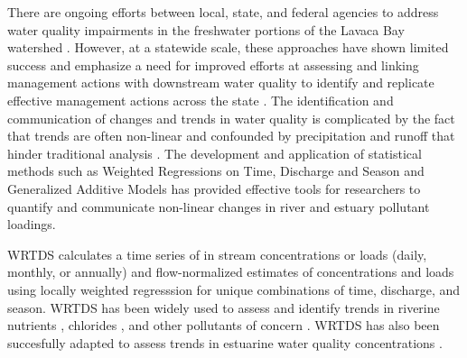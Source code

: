 \documentclass[sn-basic,referee,lineno,pdflatex]{sn-jnl}
\begin{document}
There are ongoing efforts between local, state, and federal agencies to
address water quality impairments in the freshwater portions of the
Lavaca Bay watershed
\citep{jainTechnicalSupportDocument2021, schrammLavacaRiverWatershed2018, bertholdDirectMailingEducation2021}.
However, at a statewide scale, these approaches have shown limited
success and emphasize a need for improved efforts at assessing and
linking management actions with downstream water quality to identify and
replicate effective management actions across the state
\citep{schrammTotalMaximumDaily2022}. The identification and
communication of changes and trends in water quality is complicated by
the fact that trends are often non-linear and confounded by
precipitation and runoff that hinder traditional analysis
\citep{wazniakLinkingWaterQuality2007, lloydMethodsDetectingChange2014}.
The development and application of statistical methods such as Weighted
Regressions on Time, Discharge and Season
\citep[WRTDS,][]{hirschWeightedRegressionsTime2010} and Generalized
Additive Models \citep[GAMs,][]{woodFastStableRestricted2011} has
provided effective tools for researchers to quantify and communicate
non-linear changes in river and estuary pollutant loadings.

WRTDS calculates a time series of in stream concentrations or loads
(daily, monthly, or annually) and flow-normalized estimates of
concentrations and loads using locally weighted regresssion for unique
combinations of time, discharge, and season. WRTDS has been widely used
to assess and identify trends in riverine nutrients
\citep{oelsner_recent_2019, stackpooleLongTermMississippi2021},
chlorides \citep{stetsIncreasingChlorideRivers2018}, and other
pollutants of concern \citep{shodaWaterqualityTrendsRivers2019}. WRTDS
has also been succesfully adapted to assess trends in estuarine water
quality concentrations \citep{beckFourDecadesWater2018}.
\end{document}

